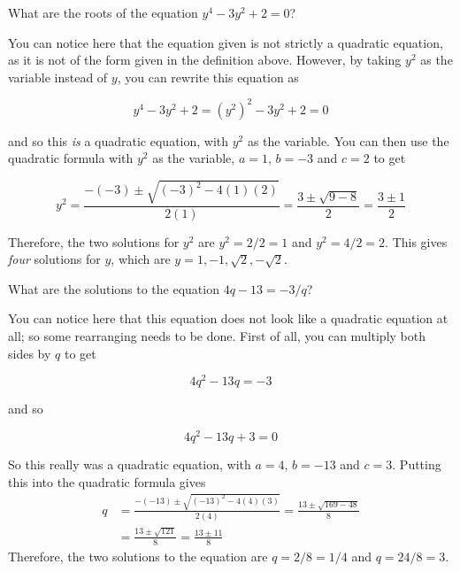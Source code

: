 \documentclass[
  12pt,
  a4paper, oneside]{starmastarticle}
\begin{document}
\begin{tcolorbox}[enhanced jigsaw, toprule=.15mm, opacityback=0, bottomrule=.15mm, arc=.35mm, left=2mm, rightrule=.15mm, breakable, leftrule=.75mm, colframe=quarto-callout-note-color-frame, colback=white]
\begin{minipage}[t]{5.5mm}
\textcolor{quarto-callout-note-color}{\faInfo}
\end{minipage}%
\begin{minipage}[t]{\textwidth - 5.5mm}
What are the roots of the equation \(y^4 - 3y^2 + 2 =0\)?

You can notice here that the equation given is not strictly a quadratic
equation, as it is not of the form given in the definition above.
However, by taking \(y^2\) as the variable instead of \(y\), you can
rewrite this equation as

\[y^4 - 3y^2 + 2 = (y^2)^2 - 3y^2 + 2 = 0\]

and so this \emph{is} a quadratic equation, with \(y^2\) as the
variable. You can then use the quadratic formula with \(y^2\) as the
variable, \(a = 1\), \(b = -3\) and \(c = 2\) to get

\[ y^2 = \frac{-(-3) \pm \sqrt{(-3)^2 - 4(1)(2)}}{2(1)} = \frac{3 \pm \sqrt{9 - 8}}{2} = \frac{3 \pm 1}{2}\]

Therefore, the two solutions for \(y^2\) are \(y^2 = 2/2 = 1\) and
\(y^2 = 4/2 = 2\). This gives \emph{four} solutions for \(y\), which are
\(y = 1, -1, \sqrt{2}, -\sqrt{2}\).\end{minipage}%
\end{tcolorbox}

\begin{tcolorbox}[enhanced jigsaw, toprule=.15mm, opacityback=0, bottomrule=.15mm, arc=.35mm, left=2mm, rightrule=.15mm, breakable, leftrule=.75mm, colframe=quarto-callout-note-color-frame, colback=white]
\begin{minipage}[t]{5.5mm}
\textcolor{quarto-callout-note-color}{\faInfo}
\end{minipage}%
\begin{minipage}[t]{\textwidth - 5.5mm}
What are the solutions to the equation \(4q - 13 = -3/q\)?

You can notice here that this equation does not look like a quadratic
equation at all; so some rearranging needs to be done. First of all, you
can multiply both sides by \(q\) to get

\[4q^2 - 13q = -3\]

and so

\[4q^2 - 13q + 3 = 0\]

So this really was a quadratic equation, with \(a = 4\), \(b = -13\) and
\(c = 3\). Putting this into the quadratic formula gives \begin{align*}
q &= \frac{-(-13) \pm \sqrt{(-13)^2 - 4(4)(3)}}{2(4)} = \frac{13 \pm \sqrt{169 - 48}}{8}\\[1em] 
&= \frac{13 \pm \sqrt{121}}{8} = \frac{13 \pm 11}{8}
\end{align*} Therefore, the two solutions to the equation are
\(q = 2/8 = 1/4\) and \(q = 24/8 = 3\).\end{minipage}%
\end{tcolorbox}
\end{document}

